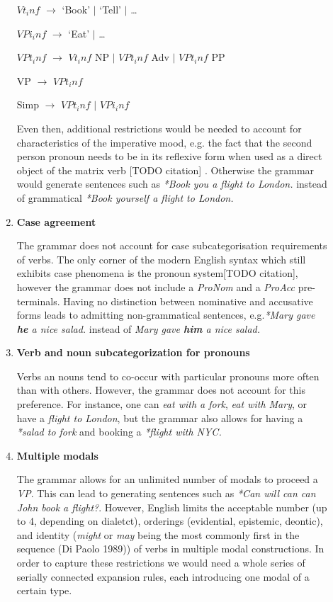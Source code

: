 \documentclass{article}
\begin{document}
\begin{description}
\begin{enumerate}
\begin{center}
			$Vt_inf$ $\rightarrow$ ‘Book’ $\vert$ ‘Tell’ $\vert$ …
			
			$VPi_inf$ $\rightarrow$ ‘Eat' $\vert$ …
			
			$VPt_inf$ $\rightarrow$ $Vt_inf$ NP $\vert$ $VPt_inf$ Adv $\vert$ $VPt_inf$ PP
			
			VP $\rightarrow$ $VPt_inf$
			
			Simp $\rightarrow$ $VPt_inf$ $\vert$ $VPi_inf$
			
		\end{center}
		Even then, additional restrictions would be needed to account for characteristics of the imperative mood, e.g. the fact that the second person pronoun needs to be in its reflexive form when used as a direct object of the matrix verb [TODO citation] . Otherwise the grammar would generate sentences such as \emph{*Book you a flight to London.} instead of grammatical \emph{*Book yourself a flight to London.}
		
		\item
		\textbf{Case agreement}
		
		The grammar does not account for case subcategorisation requirements of verbs. The only corner of the modern English syntax which still exhibits case phenomena is the pronoun system[TODO citation], however the grammar does not include a \emph{ProNom} and a \emph{ProAcc} pre-terminals. Having no distinction between nominative and accusative forms leads to admitting non-grammatical sentences, e.g.\emph{*Mary gave \textbf{he} a nice salad.} instead of \emph{Mary gave \textbf{him} a nice salad.}
		
		\item
		\textbf{Verb and noun subcategorization for pronouns}
		
		Verbs an nouns tend to co-occur with particular pronouns more often than with others. However, the grammar does not account for this preference. For instance, one can \emph{eat with a fork}, \emph{eat with Mary}, or have a \emph{flight to London}, but the grammar also allows for having a \emph{*salad to fork} and booking a \emph{*flight with NYC.}
		
		\item
		\textbf{Multiple modals}
		
		The grammar allows for an unlimited number of modals to proceed a \emph{VP}. This can lead to generating sentences such as \emph{*Can will can can John book a flight?}. However, English limits the acceptable number (up to 4, depending on dialetct), orderings (evidential, epistemic, deontic), and identity (\emph{might} or \emph{may} being the most commonly first in the sequence (Di Paolo 1989)) of verbs in multiple modal constructions. In order to capture these restrictions we would need a whole series of serially connected expansion rules, each introducing one modal of a certain type.
	\end{enumerate}
\end{description}
\end{document}
